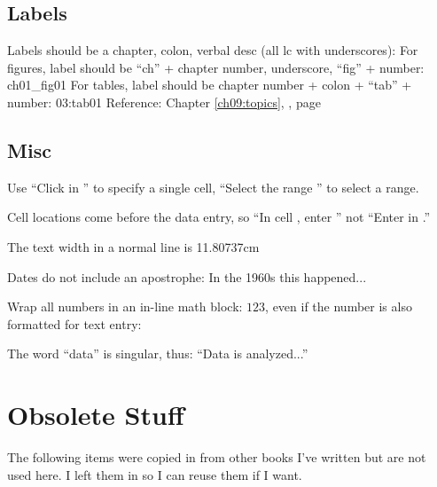 \begin{enumerate}[resume]
\subsection{Labels}
Labels should be a chapter, colon, verbal desc (all lc with underscores): \label{03:title}
For figures, label should be ``ch'' + chapter number, underscore, ``fig'' + number: ch01_fig01
For tables, label should be chapter number + colon + ``tab'' + number: 03:tab01
Reference: Chapter \ref{ch09:topics}, , page \pageref{ch09:topics}

\subsection{Misc}
Use ``Click in '' to specify a single cell, ``Select the range '' to select a range.

Cell locations come before the data entry, so ``In cell , enter '' not ``Enter  in .''

The text width in a normal line is 11.80737cm

Dates do not include an apostrophe: In the 1960s this happened...

Wrap all numbers in an in-line math block: $ 123 $, even if the number is also formatted for text entry: 

The word ``data'' is singular, thus: ``Data is analyzed...''


\section{Obsolete Stuff}
The following items were copied in from other books I've written but are not used here. I left them in so I can reuse them if I want.




\end{enumerate}
